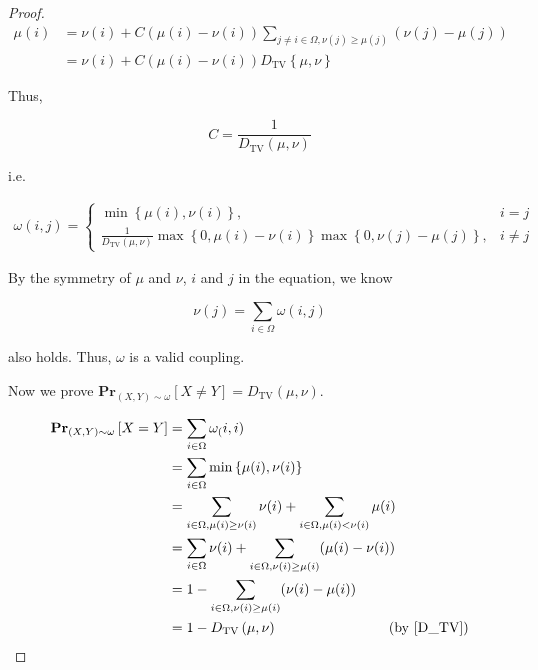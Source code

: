 \documentclass{article}
\begin{document}
\begin{proof}
\vspace{-2.5em}
\begin{align*}
    \mu(i) &= \nu(i) + C\left(\mu(i)-\nu(i)\right)\sum_{j\neq i\in\Omega, \nu(j)\geq\mu(j)}\left(\nu(j)-\mu(j)\right) \\
    &= \nu(i) + C\left(\mu(i)-\nu(i)\right)D_{\mathrm{TV}}\left\{\mu,\nu\right\}
\end{align*}

\vspace{-1em}
\hspace{3.9em}
Thus,

\vspace{-1em}
$$C=\frac{1}{D_{\mathrm{TV}}\left(\mu,\nu\right)}$$

\vspace{-1em} \hspace{3.9em}
i.e.

\vspace{-2em}
\begin{align*}
    \omega(i,j)=\left\{
    \begin{array}{ll}
    \min\left\{\mu(i),\nu(i)\right\}, & i=j \\
    \frac{1}{D_{\mathrm{TV}}\left(\mu,\nu\right)}\max\left\{0,\mu(i)-\nu(i)\right\}\max\left\{0,\nu(j)-\mu(j)\right\}, & i\neq j
    \end{array}\right.
\end{align*}

\vspace{-0.5em} \hspace{3.9em}
By the symmetry of $\mu$ and $\nu$, $i$ and $j$ in the equation, we know 

\vspace{-1.2em}
$$\nu(j) = \sum_{i\in\Omega}\omega(i,j)$$

\vspace{-0.5em} \hspace{3.9em}
also holds. Thus, $\omega$ is a valid coupling.

\vspace{3em} \hspace{1.3em}
Now we prove $\mathbf{Pr}_{(X,Y)\sim\omega}\left[X\neq Y\right]=D_{\mathrm{TV}}\left(\mu,\nu\right)$.

\vspace{-2.5em}
\begin{align*}
    \mathbf{Pr}_{(X,Y)\sim\omega}\left[X=Y\right] &= \sum_{i\in\Omega}\omega_(i,i) \\
    &= \sum_{i\in\Omega}\min\left\{\mu(i),\nu(i)\right\} \\
    &= \sum_{i\in\Omega, \mu(i)\geq \nu(i)}\nu(i) + \sum_{i\in\Omega, \mu(i)<\nu(i)}\mu(i) \\
    &= \sum_{i\in\Omega} \nu(i) + \sum_{i\in\Omega, \nu(i)\geq\mu(i)}(\mu(i)-\nu(i)) \\
    &= 1 - \sum_{i\in\Omega, \nu(i)\geq\mu(i)}(\nu(i)-\mu(i)) \\
    &= 1 - D_{\mathrm{TV}}\left(\mu,\nu\right)\qquad\qquad\qquad\qquad(\mathrm{by\ }\eqref{D_TV})
\end{align*}


\end{proof}
\end{document}
